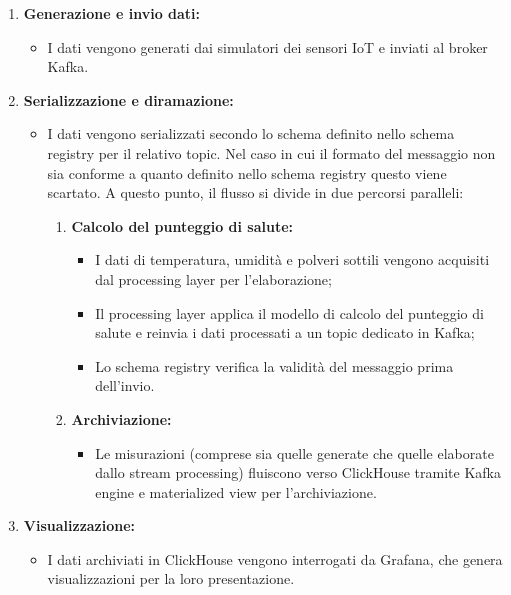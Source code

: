 \begin{enumerate}
    \item \textbf{Generazione e invio dati:}
    \begin{itemize}
        \item I dati vengono generati dai simulatori dei sensori IoT e inviati al broker Kafka.
    \end{itemize}
    
    \item \textbf{Serializzazione e diramazione:}
    \begin{itemize}
        \item I dati vengono serializzati secondo lo schema definito nello schema registry per il relativo topic.
        Nel caso in cui il formato del messaggio non sia conforme a quanto definito nello schema registry questo viene scartato. A questo punto, il flusso si divide in due percorsi paralleli:
        \begin{enumerate}
            \item \textbf{Calcolo del punteggio di salute:}
            \begin{itemize}
                \item I dati di temperatura, umidità e polveri sottili vengono acquisiti dal processing layer per l'elaborazione;
                \item Il processing layer applica il modello di calcolo del punteggio di salute e reinvia i dati processati a un topic dedicato in Kafka;
                \item Lo schema registry verifica la validità del messaggio prima dell'invio.
            \end{itemize}
            
            \item \textbf{Archiviazione:}
            \begin{itemize}
                \item Le misurazioni (comprese sia quelle generate che quelle elaborate dallo stream processing) fluiscono verso ClickHouse tramite Kafka engine e materialized view per l'archiviazione.
            \end{itemize}
        \end{enumerate}
    \end{itemize}
    
    \item \textbf{Visualizzazione:}
    \begin{itemize}
        \item I dati archiviati in ClickHouse vengono interrogati da Grafana, che genera visualizzazioni per la loro presentazione.
    \end{itemize}
\end{enumerate}

